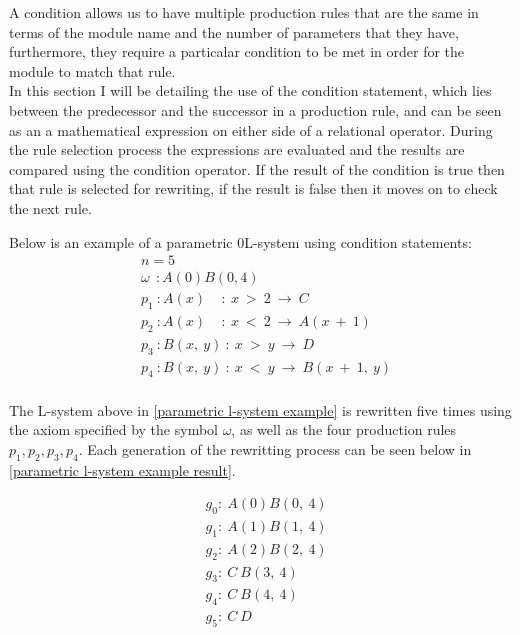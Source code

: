\begin{flushleft}

A condition allows us to have multiple production rules that are the same in terms of the module name and the number of parameters that they have, furthermore, they require a particalar condition to be met in order for the module to match that rule. \\
In this section I will be detailing the use of the condition statement, which lies between the predecessor and the successor in a production rule, and can be seen as an a mathematical expression on either side of a relational operator. During the rule selection process the expressions are evaluated and the results are compared using the condition operator. If the result of the condition is true then that rule is selected for rewriting, if the result is false then it moves on to check the next rule. \\

\vspace{5mm}

Below is an example of a parametric 0L-system using condition statements:\\

\begin{equation} \label{parametric l-system example}
\begin{aligned}
	&n=5 \\
	&\omega~~ : A(0)B(0,4)\\
	&p_1~ :  A(x)~~~~~ :~ x~ >~ 2~ \rightarrow~ C\\
	&p_2~ :  A(x)~~~~~ :~ x~ <~ 2~ \rightarrow~ A(x~ +~ 1)\\
	&p_3~ :  B(x,~ y)~ :~ x~ >~ y~ \rightarrow~ D\\
	&p_4~ :  B(x,~ y)~ :~ x~ <~ y~ \rightarrow~ B(x~ +~ 1,~ y)\\
\end{aligned}
\end{equation}

\vspace{5mm}

The L-system above in \ref{parametric l-system example} is rewritten five times using the axiom specified by the symbol $\omega$, as well as the four production rules $p_1, p_2, p_3, p_4$. Each generation of the rewritting process can be seen below in \ref{parametric l-system example result}.

\vspace{5mm}

\begin{equation} \label{parametric l-system example result}
\begin{aligned}
	&g_0 :~ A(0)B(0,~4)\\
	&g_1 :~ A(1)B(1,~4)\\
	&g_2 :~ A(2)B(2,~4)\\
	&g_3 :~ C~B(3,~4)\\
	&g_4 :~ C~B(4,~4)\\
	&g_5 :~ C~D\\
\end{aligned}
\end{equation}


\end{flushleft}
